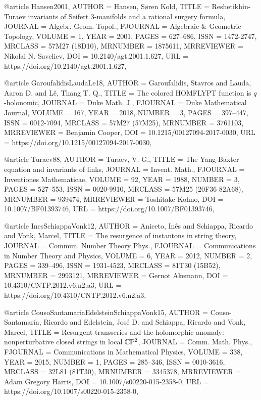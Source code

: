 @article {Hansen2001,
    AUTHOR = {Hansen, S\o ren Kold},
     TITLE = {Reshetikhin-{T}uraev invariants of {S}eifert 3-manifolds and a
              rational surgery formula},
   JOURNAL = {Algebr. Geom. Topol.},
  FJOURNAL = {Algebraic \& Geometric Topology},
    VOLUME = {1},
      YEAR = {2001},
     PAGES = {627--686},
      ISSN = {1472-2747},
   MRCLASS = {57M27 (18D10)},
  MRNUMBER = {1875611},
MRREVIEWER = {Nikolai N. Saveliev},
       DOI = {10.2140/agt.2001.1.627},
       URL = {https://doi.org/10.2140/agt.2001.1.627},
}

@article {GaroufalidisLaudaLe18,
    AUTHOR = {Garoufalidis, Stavros and Lauda, Aaron D. and L\^{e}, Thang T. Q.},
     TITLE = {The colored {HOMFLYPT} function is {$q$}-holonomic},
   JOURNAL = {Duke Math. J.},
  FJOURNAL = {Duke Mathematical Journal},
    VOLUME = {167},
      YEAR = {2018},
    NUMBER = {3},
     PAGES = {397--447},
      ISSN = {0012-7094},
   MRCLASS = {57M27 (57M25)},
  MRNUMBER = {3761103},
MRREVIEWER = {Benjamin Cooper},
       DOI = {10.1215/00127094-2017-0030},
       URL = {https://doi.org/10.1215/00127094-2017-0030},
}

@article {Turaev88,
    AUTHOR = {Turaev, V. G.},
     TITLE = {The {Y}ang-{B}axter equation and invariants of links},
   JOURNAL = {Invent. Math.},
  FJOURNAL = {Inventiones Mathematicae},
    VOLUME = {92},
      YEAR = {1988},
    NUMBER = {3},
     PAGES = {527--553},
      ISSN = {0020-9910},
   MRCLASS = {57M25 (20F36 82A68)},
  MRNUMBER = {939474},
MRREVIEWER = {Toshitake Kohno},
       DOI = {10.1007/BF01393746},
       URL = {https://doi.org/10.1007/BF01393746},
}

@article {InesSchiappaVonk12,
    AUTHOR = {Aniceto, In\^{e}s and Schiappa, Ricardo and Vonk, Marcel},
     TITLE = {The resurgence of instantons in string theory},
   JOURNAL = {Commun. Number Theory Phys.},
  FJOURNAL = {Communications in Number Theory and Physics},
    VOLUME = {6},
      YEAR = {2012},
    NUMBER = {2},
     PAGES = {339--496},
      ISSN = {1931-4523},
   MRCLASS = {81T30 (15B52)},
  MRNUMBER = {2993121},
MRREVIEWER = {Gernot Akemann},
       DOI = {10.4310/CNTP.2012.v6.n2.a3},
       URL = {https://doi.org/10.4310/CNTP.2012.v6.n2.a3},
}

@article {CousoSantamariaEdelsteinSchiappaVonk15,
    AUTHOR = {Couso-Santamar\'{i}a, Ricardo and Edelstein, Jos\'{e} D. and Schiappa,
              Ricardo and Vonk, Marcel},
     TITLE = {Resurgent transseries and the holomorphic anomaly:
              nonperturbative closed strings in local {$\Bbb{C}\Bbb{P}^2$}},
   JOURNAL = {Comm. Math. Phys.},
  FJOURNAL = {Communications in Mathematical Physics},
    VOLUME = {338},
      YEAR = {2015},
    NUMBER = {1},
     PAGES = {285--346},
      ISSN = {0010-3616},
   MRCLASS = {32L81 (81T30)},
  MRNUMBER = {3345378},
MRREVIEWER = {Adam Gregory Harris},
       DOI = {10.1007/s00220-015-2358-0},
       URL = {https://doi.org/10.1007/s00220-015-2358-0},
}

